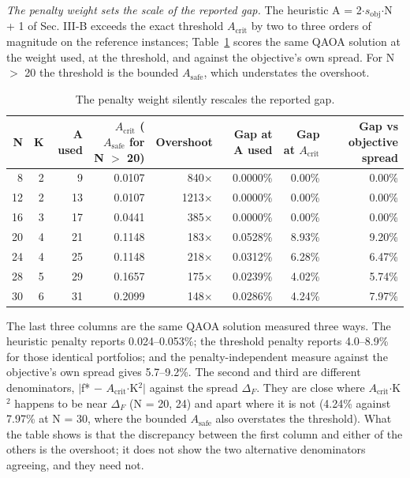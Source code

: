 \documentclass[journal]{IEEEtran}
\begin{document}
\textit{The penalty weight sets the scale of the reported gap.} The heuristic A = 2$\cdot$$s_{\mathrm{obj}}$$\cdot$N + 1 of Sec. III-B exceeds the exact threshold $A_{\mathrm{crit}}$ by two to three orders of magnitude on the reference instances; Table~\ref{tab:S7} scores the same QAOA solution at the weight used, at the threshold, and against the objective's own spread. For N $>$ 20 the threshold is the bounded $A_{\mathrm{safe}}$, which understates the overshoot.





\begin{table}[!t]
\centering
\scriptsize
\caption{The penalty weight silently rescales the reported gap.}
\label{tab:S7}
\begin{tabular}{rrrrrrrr}
\toprule
N & K & A used & $A_{\mathrm{crit}}$ ($A_{\mathrm{safe}}$ for N $>$ 20) & Overshoot & Gap at A used & Gap at $A_{\mathrm{crit}}$ & Gap vs objective spread \\
\midrule
8 & 2 & 9 & 0.0107 & 840$\times$ & 0.0000\% & 0.00\% & 0.00\% \\
12 & 2 & 13 & 0.0107 & 1213$\times$ & 0.0000\% & 0.00\% & 0.00\% \\
16 & 3 & 17 & 0.0441 & 385$\times$ & 0.0000\% & 0.00\% & 0.00\% \\
20 & 4 & 21 & 0.1148 & 183$\times$ & 0.0528\% & 8.93\% & 9.20\% \\
24 & 4 & 25 & 0.1148 & 218$\times$ & 0.0312\% & 6.28\% & 6.47\% \\
28 & 5 & 29 & 0.1657 & 175$\times$ & 0.0239\% & 4.02\% & 5.74\% \\
30 & 6 & 31 & 0.2099 & 148$\times$ & 0.0286\% & 4.24\% & 7.97\% \\
\bottomrule
\end{tabular}
\end{table}


The last three columns are the same QAOA solution measured three ways. The heuristic penalty reports 0.024--0.053\%; the threshold penalty reports 4.0--8.9\% for those identical portfolios; and the penalty-independent measure against the objective's own spread gives 5.7--9.2\%. The second and third are different denominators, $|$f* $-$ $A_{\mathrm{crit}}$$\cdot$K$^{2}$$|$ against the spread $\Delta_{F}$. They are close where $A_{\mathrm{crit}}$$\cdot$K$^{2}$ happens to be near $\Delta_{F}$ (N = 20, 24) and apart where it is not (4.24\% against 7.97\% at N = 30, where the bounded $A_{\mathrm{safe}}$ also overstates the threshold). What the table shows is that the discrepancy between the first column and either of the others is the overshoot; it does not show the two alternative denominators agreeing, and they need not.
\end{document}
